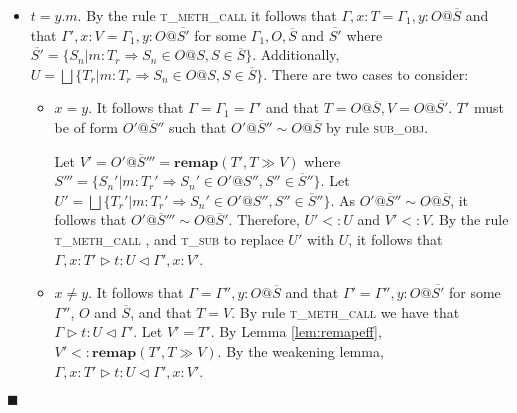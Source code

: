 \documentclass{article}
\newcommand{\lemref}[1]{Lemma \ref{#1}}
\newcommand{\tfunc}{\textsc{t\_fun\_call} }
\newcommand{\tmethc}{\textsc{t\_meth\_call} }
\newcommand{\tsub}{\textsc{t\_sub} }
\newcommand{\subobj}{\textsc{sub\_obj}}
\newcommand{\remapapp}[3]{\ensuremath{\mathbf{remap}(#1, #2 \gg #3)}}
\newcommand{\typerule}[4]{#1 \triangleright #2 : #3 \triangleleft #4}
\newcommand{\funt}[3]{(\overline{#1 \gg #2}) \rightarrow #3}
\newcommand{\qed}{$\blacksquare$}
\newenvironment{proof}{\vspace{1ex}\noindent{\bf Proof}\hspace{0.5em}}
  {\hfill\qed\vspace{1ex}}
\begin{document}
\begin{proof}
\begin{itemize}
\begin{itemize}
\item $x = y$, meaning $\Gamma = \Gamma_1, \overline{z_i : T_i}$ and
$\Gamma' = \Gamma_1, \overline{z_i : T_i'}$. 
Additionally, $T = V = \funt{U_i}{V_i}{U}$.
$T'$ must therefore be of form $\funt{U_i'}{V_i'}{U'}$ 
such that for each $i$, $U_i <: U_i'$, $V_i' <: V_i$, $U' <: U$ by the
definition of subtyping. Let $V' = T'$.
By \lemref{lem:remapeff}, $V' <: \remapapp{T'}{T}{V}$.
It follows by rule \tfunc, and \tsub to replace $U'$ with $U$, that
$\typerule{\Gamma, x : T'}{t}{U}{\Gamma', x : V'}$.

\item $x \in \overline{z_i}$, meaning that $T = T_i$ and 
$V = T_i' = \remapapp{T}{U_i}{V_i}$ for some $i$.
Let $V' = \remapapp{T'}{U_i}{V_i}$. 
By \lemref{lem:remapcv}, $V' <: V$.
As $T' <: T$, we can type $t$ by rule \tfunc such that
$\typerule{\Gamma, x : T'}{t}{U}{\Gamma, x : V'}$.

\end{itemize}

\item $t = y.m$. By the rule \tmethc it follows that
$\Gamma, x : T = \Gamma_1, y : O@\overline{S}$
and that
$\Gamma', x : V = \Gamma_1, y : O@\overline{S'}$
for some $\Gamma_1, O, \overline{S}$ and $\overline{S'}$
where
$\overline{S'} = \{ S_n | m : T_r \Rightarrow S_n \in O@S, S \in \overline{S} \}$.
Additionally, 
$U = \bigsqcup{ \{ T_r | m : T_r \Rightarrow S_n \in O@S, S \in \overline{S} \} }$.
There are two cases to consider:

\begin{itemize}
\item $x = y$. It follows that $\Gamma = \Gamma_1 = \Gamma'$ and
that $T = O@\overline{S}, V = O@\overline{S'}$.
$T'$ must be of form $O'@\overline{S}''$ such that
$O'@\overline{S}'' \sim O@\overline{S}$ by rule \subobj.

Let $V' = O'@\overline{S}''' = \remapapp{T'}{T}{V}$
where
$S''' = \{ S_n' | m : T_r' \Rightarrow S_n' \in O'@S'', S'' \in \overline{S}''\}$.
Let $U' = \bigsqcup{ \{ T_r' | m : T_r' \Rightarrow S_n' \in O'@S'', S'' \in \overline{S}'' \} }$.
As $O'@\overline{S}'' \sim O@\overline{S}$, it follows that
$O'@\overline{S}''' \sim O@\overline{S}'$.
Therefore, $U' <: U$ and $V' <: V$. By the rule \tmethc, and \tsub
to replace $U'$ with $U$, it follows that
$\typerule{\Gamma, x : T'}{t}{U}{\Gamma', x : V'}$.

\item $x \neq y$. It follows that $\Gamma = \Gamma'', y : O@\overline{S}$
and that $\Gamma' = \Gamma'', y : O@\overline{S'}$
for some $\Gamma''$, $O$ and $\overline{S}$, and that
$T = V$.
By rule \tmethc we have that $\typerule{\Gamma}{t}{U}{\Gamma'}$.
Let $V' = T'$. By \lemref{lem:remapeff}, $V' <: \remapapp{T'}{T}{V}$.
By the weakening lemma, 
$\typerule{\Gamma, x : T'}{t}{U}{\Gamma', x : V'}$.


\end{itemize}
\end{itemize}
\end{proof}
\end{document}
